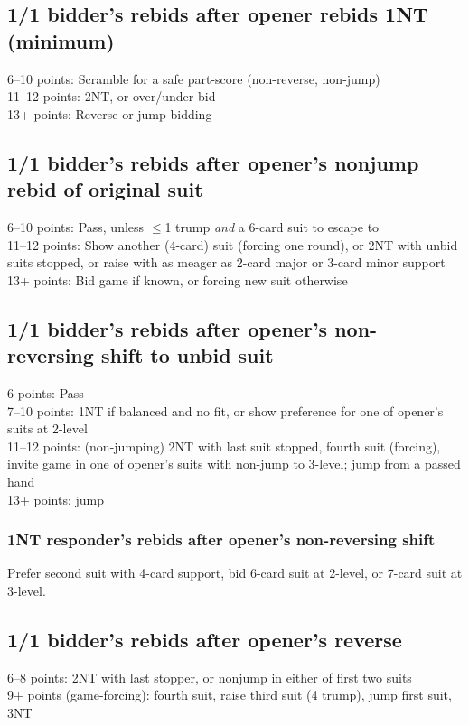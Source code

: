 \documentclass{article}
\let\TeXle\le
\def\le{$\TeXle$}
\begin{document}
\subsection{1/1 bidder's rebids after opener rebids 1NT (minimum)}
6--10 points: Scramble for a safe part-score (non-reverse, non-jump)\\
11--12 points: 2NT, or over/under-bid\\
13+ points: Reverse or jump bidding

\subsection{1/1 bidder's rebids after opener's nonjump rebid of original suit}
6--10 points: Pass, unless \le1 trump \emph{and} a 6-card suit to escape to\\
11--12 points: Show another (4-card) suit (forcing one round), or 2NT with
unbid suits stopped, or raise with as meager as 2-card major or 3-card minor 
support\\
13+ points: Bid game if known, or forcing new suit otherwise

\subsection{1/1 bidder's rebids after opener's non-reversing shift to unbid suit}
6 points: Pass\\
7--10 points: 1NT if balanced and no fit, or show preference for one of opener's suits at 2-level\\
11--12 points: (non-jumping) 2NT with last suit stopped, fourth suit (forcing),
invite game in one of opener's suits with non-jump to 3-level; jump from a 
passed hand\\
13+ points: jump
\subsubsection{1NT responder's rebids after opener's non-reversing shift}
Prefer second suit with 4-card support, bid 6-card suit at 2-level, or 7-card
suit at 3-level.

\subsection{1/1 bidder's rebids after opener's reverse}
6--8 points: 2NT with last stopper, or nonjump in either of first two suits\\
9+ points (game-forcing): fourth suit, raise third suit (4 trump), jump first suit, 3NT
\end{document}
